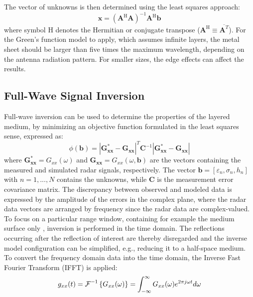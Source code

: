 The vector of unknowns is then determined using the least squares approach:
\begin{equation}
\mathbf{x}=\left(\mathbf{A}^{\text{H}}\mathbf{A}\right)^{-1}\mathbf{A}^{\text{H}}\mathbf{b}
\end{equation}
where symbol H denotes the Hermitian or conjugate transpose
($\mathbf{A}^{\text{H}}\equiv\overline{\mathbf{A}^{T}}$). For the Green's function model to apply, which assumes infinite layers, the metal sheet should be larger than five times the maximum wavelength, depending on the antenna radiation pattern. For smaller sizes, the edge effects can affect the results.

\subsection{Full-Wave Signal Inversion} \label{sec:radar-challenges:inversion}
Full-wave inversion can be used to determine the properties of the layered medium, by minimizing an objective function formulated in the least squares sense, expressed as:
\begin{equation}\label{OF}
\phi(\mathbf{b})=
\left|\mathbf{G^*_{xx}}-\mathbf{G_{xx}}\right|^T\mathbf{C}^{-1}
\left|\mathbf{G^*_{xx}}-\mathbf{G_{xx}}\right|
\end{equation}
where $\mathbf{G^*_{xx}}=G_{xx}(\omega)$ and $\mathbf{G_{xx}}=G_{xx}(\omega,\mathbf{b})$ are the vectors containing the measured and simulated radar signals, respectively. The vector $\mathbf{b}=[\varepsilon_n, \sigma_n, h_n]$ with $n=1,...,N$ contains the unknowns, while $\mathbf{C}$ is the measurement error covariance matrix. The discrepancy between observed and modeled data is expressed by the amplitude of the errors in the complex plane, where the radar data vectors are arranged by frequency since the radar data are complex-valued. To focus on a particular range window, containing for example the medium surface only \cite{Lambot:2006}, inversion is performed in the time domain. The reflections occurring after the reflection of interest are thereby disregarded and the inverse model configuration can be simplified, e.g., reducing it to a half-space medium. To convert the frequency domain data into the time domain, the Inverse Fast Fourier Transform (IFFT) is applied:
\begin{equation}
\label{eq:radar-challenges:ifft}
g_{xx}(t)=\text{$\cal{F}$}^{-1}\left\{
G_{xx}(\omega)
\right\}=\int_{-\infty}^{\infty}G_{xx}(\omega)e^{2\pi j \omega
t}d\omega
\end{equation}
